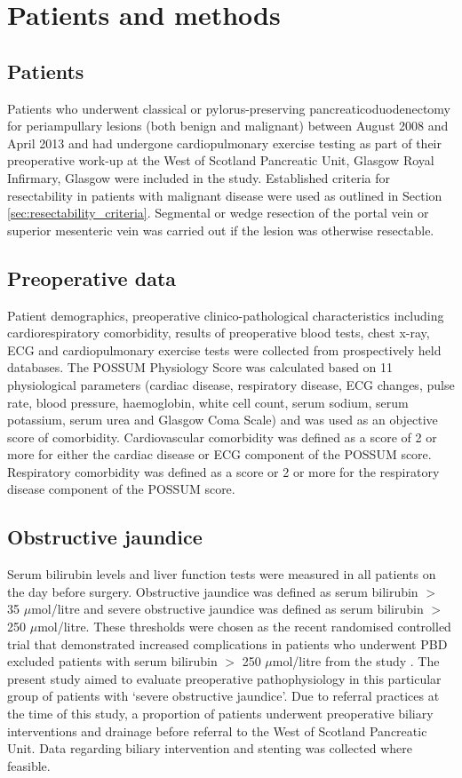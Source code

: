 \clearpage

\section{Patients and methods}

\subsection{Patients}
Patients who underwent classical or pylorus-preserving pancreaticoduodenectomy for periampullary lesions (both benign and malignant) between August 2008 and April 2013 and had undergone cardiopulmonary exercise testing as part of their preoperative work-up at the West of Scotland Pancreatic Unit, Glasgow Royal Infirmary, Glasgow were included in the study. 
Established criteria for resectability in patients with malignant disease were used as outlined in Section \ref{sec:resectability_criteria}. 
Segmental or wedge resection of the portal vein or superior mesenteric vein was carried out if the lesion was otherwise resectable.

\subsection{Preoperative data}
Patient demographics, preoperative clinico-pathological characteristics including cardiorespiratory comorbidity, results of preoperative blood tests, chest x-ray, ECG and cardiopulmonary exercise tests were collected from prospectively held databases. 
The POSSUM Physiology Score was calculated based on 11 physiological parameters (cardiac disease, respiratory disease, ECG changes, pulse rate, blood pressure, haemoglobin, white cell count, serum sodium, serum potassium, serum urea and Glasgow Coma Scale) and was used as an objective score of comorbidity. 
Cardiovascular comorbidity was defined as a score of 2 or more for either the cardiac disease or ECG component of the POSSUM score. 
Respiratory comorbidity was defined as a score or 2 or more for the respiratory disease component of the POSSUM score. 

\subsection{Obstructive jaundice}
Serum bilirubin levels and liver function tests were measured in all patients on the day before surgery. 
Obstructive jaundice was defined as serum bilirubin $>$ 35 $\mu$mol/litre and severe obstructive jaundice was defined as serum bilirubin $>$ 250 $\mu$mol/litre. 
These thresholds were chosen as the recent randomised controlled trial that demonstrated increased complications in patients who underwent PBD excluded patients with serum bilirubin $>$ 250 $\mu$mol/litre from the study \parencite{van_der_gaag_preoperative_2010}.
The present study aimed to evaluate preoperative pathophysiology in this particular group of patients with `severe obstructive jaundice'.
Due to referral practices at the time of this study, a proportion of patients underwent preoperative biliary interventions and drainage before referral to the West of Scotland Pancreatic Unit. 
Data regarding biliary intervention and stenting was collected where feasible.

